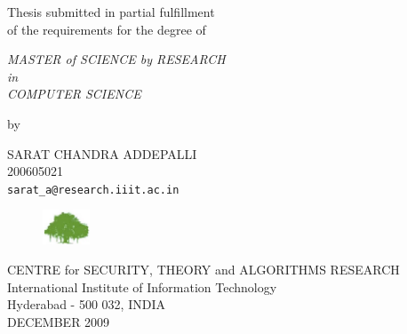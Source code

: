 \thispagestyle{empty}
\begin{center}
\vspace*{1.5cm}
{\Large \bf \thistitle}

\vspace*{3.75cm}
{\large Thesis submitted in partial fulfillment\\}
{\large  of the requirements for the degree of \\}

\vspace*{1cm}
{\it {\large MASTER of SCIENCE by RESEARCH} \\
{\large in\\}
{\large COMPUTER SCIENCE \\}}

\vspace*{1cm}
{\large by}

\vspace*{5mm}
{\large SARAT CHANDRA ADDEPALLI\\}
{\large 200605021\\
{\small \tt sarat\_a@research.iiit.ac.in}}


\vspace*{3.0cm}
\begin{figure}[h]
\centering
\includegraphics[width=14mm]{figures/iiit.png}
\end{figure}
{\large CENTRE for SECURITY, THEORY and ALGORITHMS RESEARCH \\}
{\large International Institute of Information Technology\\}
{\large Hyderabad - 500 032, INDIA\\}
{\large DECEMBER 2009\\}
\end{center}
